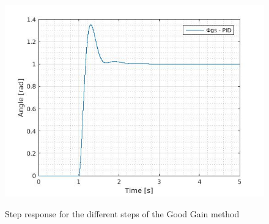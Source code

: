 \begin{figure}[H]
{\includegraphics[scale=0.29]{figures/GG3.jpg}
\label{fig:subim12}}
\hfill
{}
\hfill
{}
\hfill

\caption{Step response for the different steps of the Good Gain method}

\end{figure}



